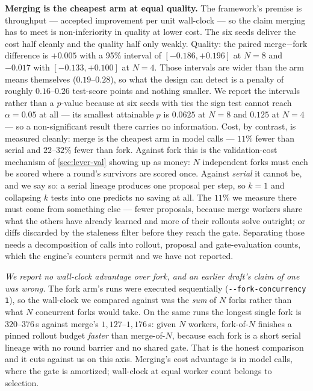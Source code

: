 \documentclass{article}
\newcommand{\code}[1]{\texttt{#1}}
\begin{document}
\textbf{Merging is the cheapest arm at equal quality.} The framework's premise is throughput --- accepted improvement per unit wall-clock --- so the claim merging has to meet is non-inferiority in quality at lower cost. The six seeds deliver the cost half cleanly and the quality half only weakly. Quality: the paired merge${-}$fork difference is $+0.005$ with a 95\% interval of $[-0.186, +0.196]$ at $N{=}8$ and $-0.017$ with $[-0.133, +0.100]$ at $N{=}4$. Those intervals are wider than the arm means themselves ($0.19$--$0.28$), so what the design can detect is a penalty of roughly $0.16$--$0.26$ test-score points and nothing smaller. We report the intervals rather than a $p$-value because at six seeds with ties the sign test cannot reach $\alpha = 0.05$ at all --- its smallest attainable $p$ is $0.0625$ at $N{=}8$ and $0.125$ at $N{=}4$ --- so a non-significant result there carries no information. Cost, by contrast, is measured cleanly: merge is the cheapest arm in model calls --- $11\%$ fewer than serial and $22$--$32\%$ fewer than fork. Against fork this is the validation-cost mechanism of \cref{sec:lever-val} showing up as money: $N$ independent forks must each be scored where a round's survivors are scored once. Against \emph{serial} it cannot be, and we say so: a serial lineage produces one proposal per step, so $k = 1$ and collapsing $k$ tests into one predicts no saving at all. The $11\%$ we measure there must come from something else --- fewer proposals, because merge workers share what the others have already learned and more of their rollouts solve outright; or diffs discarded by the staleness filter before they reach the gate. Separating those needs a decomposition of calls into rollout, proposal and gate-evaluation counts, which the engine's counters permit and we have not reported.

\emph{We report no wall-clock advantage over fork, and an earlier draft's claim of one was wrong.} The fork arm's runs were executed sequentially (\code{-{}-fork-concurrency 1}), so the wall-clock we compared against was the \emph{sum} of $N$ forks rather than what $N$ concurrent forks would take. On the same runs the longest single fork is $320$--$376$\,s against merge's $1{,}127$--$1{,}176$\,s: given $N$ workers, fork-of-$N$ finishes a pinned rollout budget \emph{faster} than merge-of-$N$, because each fork is a short serial lineage with no round barrier and no shared gate. That is the honest comparison and it cuts against us on this axis. Merging's cost advantage is in model calls, where the gate is amortized; wall-clock at equal worker count belongs to selection.
\end{document}
